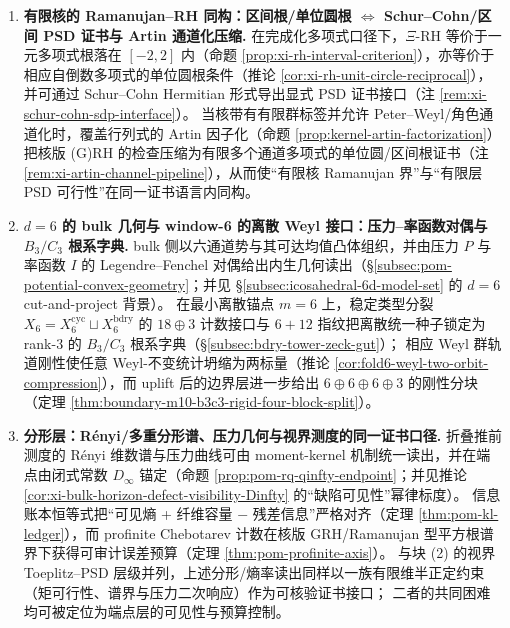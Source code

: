 \begin{enumerate}
  \item \textbf{有限核的 Ramanujan--RH 同构：区间根/单位圆根 \(\Leftrightarrow\) Schur--Cohn/区间 PSD 证书与 Artin 通道化压缩.}
  在完成化多项式口径下，\(\Xi\)-RH 等价于一元多项式根落在 \([-2,2]\) 内（命题 \ref{prop:xi-rh-interval-criterion}），亦等价于相应自倒数多项式的单位圆根条件（推论 \ref{cor:xi-rh-unit-circle-reciprocal}），并可通过 Schur--Cohn Hermitian 形式导出显式 PSD 证书接口（注 \ref{rem:xi-schur-cohn-sdp-interface}）。
  当核带有有限群标签并允许 Peter--Weyl/角色通道化时，覆盖行列式的 Artin 因子化（命题 \ref{prop:kernel-artin-factorization}）把核版 (G)RH 的检查压缩为有限多个通道多项式的单位圆/区间根证书（注 \ref{rem:xi-artin-channel-pipeline}），从而使“有限核 Ramanujan 界”与“有限层 PSD 可行性”在同一证书语言内同构。

  \item \textbf{\texorpdfstring{$d=6$}{d=6} 的 bulk 几何与 window-6 的离散 Weyl 接口：压力--率函数对偶与 \texorpdfstring{$B_3/C_3$}{B3/C3} 根系字典.}
  bulk 侧以六通道势与其可达均值凸体组织，并由压力 \(P\) 与率函数 \(I\) 的 Legendre--Fenchel 对偶给出内生几何读出（\S\ref{subsec:pom-potential-convex-geometry}；并见 \S\ref{subsec:icosahedral-6d-model-set} 的 \(d=6\) cut-and-project 背景）。
  在最小离散锚点 \(m=6\) 上，稳定类型分裂 \(X_6=X_6^{\mathrm{cyc}}\sqcup X_6^{\mathrm{bdry}}\) 的 \(18\oplus 3\) 计数接口与 \(6+12\) 指纹把离散统一种子锁定为 rank-\(3\) 的 \(B_3/C_3\) 根系字典（\S\ref{subsec:bdry-tower-zeck-gut}）；
  相应 Weyl 群轨道刚性使任意 Weyl-不变统计坍缩为两标量（推论 \ref{cor:fold6-weyl-two-orbit-compression}），而 uplift 后的边界层进一步给出 \(6\oplus 6\oplus 6\oplus 3\) 的刚性分块（定理 \ref{thm:boundary-m10-b3c3-rigid-four-block-split}）。

  \item \textbf{分形层：Rényi/多重分形谱、压力几何与视界测度的同一证书口径.}
  折叠推前测度的 Rényi 维数谱与压力曲线可由 moment-kernel 机制统一读出，并在端点由闭式常数 \(D_\infty\) 锚定（命题 \ref{prop:pom-rq-qinfty-endpoint}；并见推论 \ref{cor:xi-bulk-horizon-defect-visibility-Dinfty} 的“缺陷可见性”幂律标度）。
  信息账本恒等式把“可见熵 + 纤维容量 \(-\) 残差信息”严格对齐（定理 \ref{thm:pom-kl-ledger}），而 profinite Chebotarev 计数在核版 GRH/Ramanujan 型平方根谱界下获得可审计误差预算（定理 \ref{thm:pom-profinite-axis}）。
  与块 (2) 的视界 Toeplitz--PSD 层级并列，上述分形/熵率读出同样以一族有限维半正定约束（矩可行性、谱界与压力二次响应）作为可核验证书接口；
  二者的共同困难均可被定位为端点层的可见性与预算控制。


\end{enumerate}

